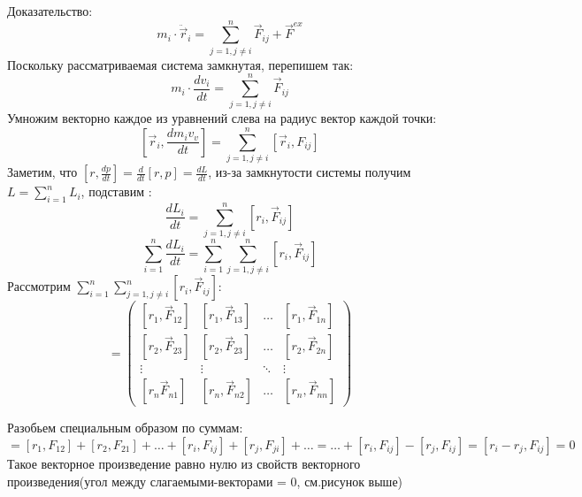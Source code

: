 \documentclass[12pt,a4paper]{report}
\begin{document}
Доказательство:
\[ m_i \cdot \ddot \vec r_i = \sum_{j = 1, j \neq i }^n \vec F_{ij} + \vec F^{ex} \]
Поскольку рассматриваемая система замкнутая, перепишем так:
\[ m_i \cdot \frac{dv_i}{dt} = \sum_{j = 1, j \neq i}^n \vec F_{ij}\]
Умножим векторно каждое из уравнений слева на радиус вектор каждой точки:
\[ [\vec r_i, \frac{dm_iv_v}{dt}] = \sum_{j = 1, j \neq i}^n [\vec r_i, F_{ij}]\]
Заметим, что $[r,\frac{dp}{dt}] = \frac{d}{dt}[r,p] = \frac{dL}{dt}$, из-за замкнутости системы получим $L =\sum_{i = 1}^n L_i$, подставим :
\[ \frac{dL_i}{dt} = \sum_{j = 1, j \neq i}^n [r_i, \vec F_{ij}]\]
\[\sum_{i = 1}^n \frac{dL_i}{dt} = \sum_{i = 1}^n \sum_{j = 1, j \neq i}^n [r_i, \vec F_{ij}]\]
Рассмотрим $\sum_{i = 1}^n \sum_{j = 1, j \neq i}^n [r_i, \vec F_{ij}] :$
\begin{equation*}
    = \left(
    \begin{array}{cccc}
        [r_1, \vec F_{12}]   & [r_1, \vec F_{13}] & \ldots & [r_1, \vec F_{1n}] \\
        {[r_2, \vec F_{23}]} & [r_2, \vec F_{23}] & \ldots & [r_2, \vec F_{2n}] \\
        \vdots               & \vdots             & \ddots & \vdots             \\
        {[r_n \vec F_{n1}]}  & [r_n, \vec F_{n2}] & \ldots & [r_n, \vec F_{nn}]
    \end{array}
    \right)
\end{equation*}
\begin{center}
\end{center}
Разобьем специальным образом по суммам:
\[ = [r_1, F_{12}] + [r_2, F_{21}] + \ldots + [r_i,F_{ij}] + [r_j, F_{ji}] + \ldots  = \ldots + [r_i,F_{ij}] - [r_j, F_{ij}] = [r_i - r_j, F_{ij}] = 0\]
Такое векторное произведение равно нулю из свойств векторного произведения(угол между слагаемыми-векторами = 0, см.рисунок выше)
\end{document}
